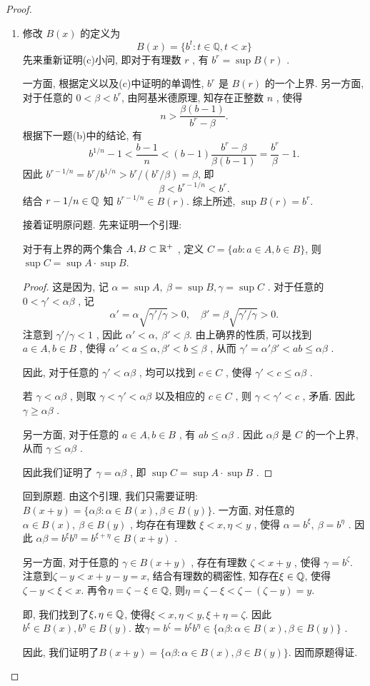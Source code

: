 \documentclass{article}
\begin{document}
\begin{proof}
\begin{enumerate}[label=(\alph*)]
\item 修改 $ B(x) $ 的定义为
 \[ B(x) = \{ b^t : t \in \mathbb{Q}, t < x \} \]
先来重新证明(c)小问, 即对于有理数 $ r $ , 有 $ b^r=\sup B(r) $ .\par 
一方面, 根据定义以及(c)中证明的单调性, $ b^r $ 是 $ B(r) $ 的一个上界. 另一方面, 对于任意的 $ 0<\beta<b^r $, 由阿基米德原理, 知存在正整数 $ n $ , 使得
\[ n>\frac{\beta(b-1)}{b^r-\beta}. \]  
根据下一题(b)中的结论, 有 
\[ b^{1/n}-1<\frac{b-1}{n}<(b-1)\frac{b^r-\beta}{\beta (b-1)}=\frac{b^r}{\beta}-1. \]
因此 $ b^{r-1/n}=b^r/b^{1/n}>b^r/(b^r/\beta)=\beta $, 即 
\[ \beta<b^{r-1/n}<b^r. \]
结合 $ r-1/n\in\mathbb{Q} $ 知 $ b^{r-1/n}\in B(r) $. 综上所述, $ \sup B(r)= b^{r} $. \par
接着证明原问题. 先来证明一个引理: 
\begin{lemma}
对于有上界的两个集合 $ A,B\subset\mathbb{R}^+ $ , 定义 $ C=\{ab:a\in A, b\in B\} $, 则 $ \sup C=\sup A\cdot\sup B. $ 
\end{lemma}
\begin{proof}
这是因为, 记 $ \alpha=\sup A,\ \beta=\sup B, \gamma=\sup C $ . 对于任意的 $ 0<\gamma'<\alpha\beta $ , 记
\[ \alpha'=\alpha\sqrt{\gamma'/\gamma}>0, \quad \beta'=\beta\sqrt{\gamma'/\gamma}>0. \]
注意到 $ \gamma'/\gamma<1 $ , 因此 $ \alpha'<\alpha,\ \beta'<\beta. $ 由上确界的性质, 可以找到 $ a\in A, b\in B $ , 使得 $ \alpha'<a\le\alpha, \beta'<b\le\beta $ , 从而 $ \gamma'=\alpha'\beta'<ab\le\alpha\beta $ . \par
因此, 对于任意的 $ \gamma'<\alpha\beta $ , 均可以找到 $ c\in C $ , 使得 $ \gamma'<c\le\alpha\beta $ . \par
若 $ \gamma<\alpha\beta $ , 则取 $ \gamma<\gamma'<\alpha\beta $ 以及相应的 $ c\in C $ , 则 $ \gamma<\gamma'<c $ , 矛盾. 因此 $ \gamma\ge\alpha\beta $ .\par
另一方面, 对于任意的 $ a\in A, b\in B $ , 有 $ ab\le\alpha\beta $ . 因此 $ \alpha\beta $ 是 $ C $ 的一个上界, 从而 $ \gamma\le\alpha\beta $ .\par 
因此我们证明了 $ \gamma=\alpha\beta $ , 即 $ \sup C=\sup A\cdot\sup B $ .
\end{proof}
回到原题. 由这个引理, 我们只需要证明:  $ B(x+y)=\{\alpha\beta:\alpha\in B(x), \beta\in B(y)\}. $ 一方面, 对任意的 $ \alpha\in B(x),\ \beta\in B(y) $ , 均存在有理数 $ \xi< x, \eta< y $ , 使得 $ \alpha=b^{\xi},\ \beta=b^{\eta} $ . 因此 $ \alpha\beta=b^{\xi}b^{\eta}=b^{\xi+\eta}\in B(x+y) $ .\par
另一方面, 对于任意的 $ \gamma\in B(x+y) $ , 存在有理数 $ \zeta< x+y $ , 使得 $ \gamma=b^{\zeta} $. 注意到$ \zeta-y<x+y-y=x $, 结合有理数的稠密性, 知存在$ \xi\in\mathbb{Q} $, 使得$ \zeta-y<\xi<x $. 再令$ \eta=\zeta-\xi\in\mathbb{Q} $, 则$ \eta=\zeta-\xi<\zeta-(\zeta-y)=y $. \par 
即, 我们找到了$ \xi,\eta\in\mathbb{Q} $, 使得$ \xi<x,\eta<y,\xi+\eta=\zeta $. 因此$ b^\xi\in B(x), b^\eta\in B(y) $. 故$ \gamma=b^{\zeta}=b^{\xi}b^{\eta}\in\{\alpha\beta:\alpha\in B(x), \beta\in B(y)\} $ . \par
因此, 我们证明了$ B(x+y)=\{\alpha\beta:\alpha\in B(x), \beta\in B(y)\} $. 因而原题得证.\end{enumerate} 
\end{proof}
\end{document}
